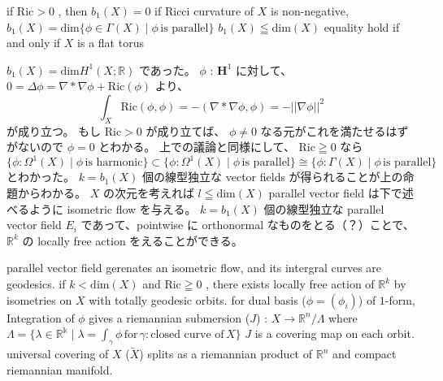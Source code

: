 \begin{Theorem}
\itemprop
  if \(\text{Ric} > 0\) , then \(b_1(X) = 0\)
\itemprop
  if Ricci curvature of \(X\) is non-negative, \(b_1(X) = \text{dim}\{\phi \in \Gamma(X) \mid \phi \, \text{is parallel}\}\)
\itemprop
  \(b_1(X) \leqq \text{dim}(X)\)
\itemprop
  equality hold if and only if \(X\) is a flat torus
\end{Theorem}

\begin{Proof}
\itemprof
  \(b_1(X) = \text{dim}H^1(X ; \mathbb{R})\) であった。
  \(\phi\) : \(\mathbf{H}^1\) に対して、 \(0 = \Delta \phi = \nabla * \nabla \phi + \text{Ric}(\phi)\) より、
  \[\int_X \text{Ric}(\phi , \phi) = - (\nabla * \nabla \phi , \phi) = - || \nabla \phi ||^2\]
  が成り立つ。
  もし \(\text{Ric} > 0\) が成り立てば、 \(\phi \not = 0\) なる元がこれを満たせるはずがないので \(\phi = 0\) とわかる。
\itemprof
  上での議論と同様にして、 \(\text{Ric} \geqq 0\) なら
  \[\{\phi : \Omega^1(X) \mid \phi \, \text{is harmonic}\} \subset \{\phi : \Omega^1(X) \mid \phi \, \text{is parallel}\} \cong \{\phi : \Gamma(X) \mid \phi \, \text{is parallel}\}\]
  とわかった。
  \SORRY
\itemprof
  \(k = b_1(X)\) 個の線型独立な vector fields が得られることが上の命題からわかる。
  \(X\) の次元を考えれば \(l \leqq \text{dim}(X)\)
\itemprof
  parallel vector field は下で述べるように isometric flow を与える。
  \(k = b_1(X)\) 個の線型独立な parallel vector field \(E_i\) であって、pointwise に orthonormal なものをとる（？）ことで、 \(\mathbb{R}^k\) の locally free action をえることができる。
\end{Proof}

\begin{Theorem}
\itemprop
  parallel vector field gerenates an isometric flow, and its intergral curves are geodesics.
\itemprop
  if \(k < \text{dim}(X)\) and \(\text{Ric} \geqq 0\) , there exists locally free action of \(\mathbb{R}^k\) by isometries on \(X\) with totally geodesic orbits.
\itemprop
  for dual basis (\(\phi = (\phi_i)\)) of \(1\)-form, Integration of \(\phi\) gives a riemannian submersion (\(J\)) : \(X \to \mathbb{R}^n / \Lambda\) where \(\Lambda = \{\lambda \in \mathbb{R^k} \mid \lambda = \int_{\gamma} \phi \, \text{for} \, \gamma : \text{closed curve of} \, X\}\)
\itemprop
  \(J\) is a covering map on each orbit.
\itemprop
  universal covering of \(X\) (\(\tilde{X}\)) splits as a riemannian product of \(\mathbb{R}^n\) and compact riemannian manifold.
\end{Theorem}

\begin{Proof}
\itemprof
  \ADMIT
\end{Proof}


